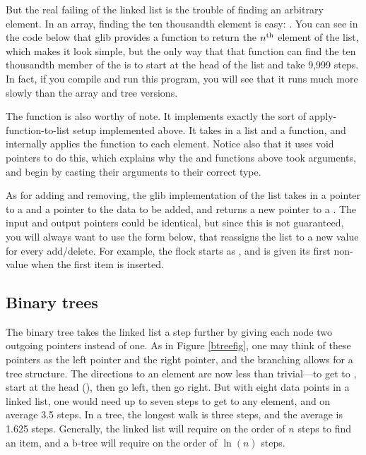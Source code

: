 But the real failing of the linked list is the trouble of finding an
arbitrary element.  In an array, finding the ten thousandth element is
easy: .
You can see in the code below
that glib provides a  function to return the
$n^{\rm th}$ element of the list, which makes it look simple,
but the only way that that function can find the ten
thousandth member of the  is to start at the head of the list
and take 9,999 
steps. In fact, if you compile and run this
program, you will see that it runs much more slowly than the array and tree 
versions.

 The  function is also worthy of note. It implements
exactly the sort of apply-function-to-list setup implemented above. It
takes in a list and a function, and internally applies the function to
each element. Notice also that it uses void pointers to do this, which
explains why the  and  functions
above took  arguments, and begin by casting their arguments to
their correct type.

 As for adding and removing, the glib implementation of the list takes in
a pointer to a  and a pointer to the data to be added, and
returns a new pointer to a . The input and output pointers
could be identical, but since this is not guaranteed, you will always
want to use the form below, that reassigns the list to a new value for
every add/delete. For example, the flock starts as , and is
given its first non- value when the first item is inserted.





\subsection{Binary trees} The binary tree takes the linked list a step further
by giving each node two outgoing pointers instead of one. As in Figure
\ref{btreefig}, one may think of these pointers as the left pointer and
the right pointer, and the branching allows for a tree structure. The
directions to an element are now less than trivial---to get to
, start at the head (), then go left, then go right.
But with eight data points in a linked list, one would need up to seven
steps to get to any element, and on average 3.5 steps. In a tree, the
longest walk is three steps, and the average is 1.625 steps. Generally,
the linked list will require on the order of $n$ steps to find an item, and a b-tree
will require on the order of $\ln(n)$ steps.

